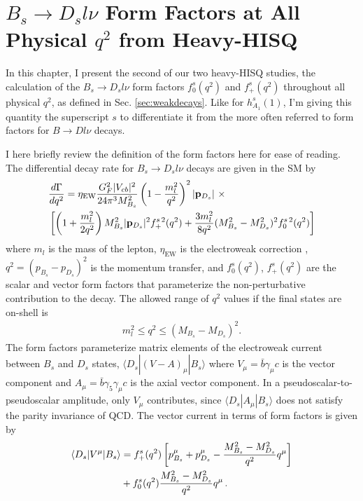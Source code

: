 ﻿\chapter{$B_s\to D_sl\nu$ Form Factors at All Physical $q^2$ from Heavy-HISQ}
\label{chap:BsDs}

In this chapter, I present the second of our two heavy-HISQ studies, the calculation of the $B_s\to D_sl\nu$ form factors $f^s_0(q^2)$ and $f^s_+(q^2)$ throughout all physical $q^2$, as defined in Sec. \ref{sec:weakdecays}. Like for $h_{A_1}^s(1)$, I'm giving this quantity the superscript $s$ to differentiate it from the more often referred to form factors for $B\to Dl\nu$ decays.

I here briefly review the definition of the form factors here for ease of reading. The differential decay rate for $B_s\to D_s l \nu$ decays are given in the SM by
\begin{align}
  &{d\Gamma\over dq^2} = \eta_{\text{EW}} { G_F^2 |V_{cb}|^2\over 24 \pi^3 M_{B_s}^2 } \left( 1 - {m_l^2\over q^2}\right)^2 |{\bf{p}}_{D_s}| \,\,\times \\
  \label{eq:branchingfraction}
  &\left[ \left( 1 + {m_l^2\over 2q^2}\right) M_{B_s}^2 |{\bf{p}}_{D_s}|^2 f_+^{s\,2}(q^2) + {3m_l^2\over 8q^2} (M_{B_s}^2-M_{D_s}^2)^2 f_0^{s\,2}(q^2) \right] \nonumber
\end{align}
where $m_l$ is the mass of the lepton, $\eta_{\text{EW}}$ is the electroweak correction \cite{SIRLIN198283,Ginsberg1968,PhysRevD.41.1736}, $q^2 = (p_{B_s} - p_{D_s})^2$ is the momentum transfer, and $f_0^s(q^2)$, $f_+^s(q^2)$ are the scalar and vector form factors that parameterize the non-perturbative contribution to the decay. The allowed range of $q^2$ values if the final states are on-shell is
\begin{align}
  m_l^2 \leq q^2 \leq (M_{B_s}-M_{D_s})^2.
\end{align}
The form factors parameterize matrix elements of the electroweak current between $B_s$ and $D_s$ states, $\langle D_s | (V-A)_{\mu} | B_s \rangle$ where $V_{\mu}=\bar{b}\gamma_{\mu}c$ is the vector component and $A_{\mu}=\bar{b}\gamma_5\gamma_{\mu} c$ is the axial vector component. In a pseudoscalar-to-pseudoscalar amplitude, only $V_{\mu}$ contributes, since $\langle D_s | A_{\mu} | B_s \rangle$ does not satisfy the parity invariance of QCD. The vector current in terms of form factors is given by
\begin{align}
  \langle D_s | V^{\mu} | B_s \rangle &= f_+^s(q^2) \left[ p_{B_s}^{\mu} + p_{D_s}^{\mu} - {M_{B_s}^2 - M_{D_s}^2 \over q^2} q^{\mu} \right] \nonumber \\
  &+ f_0^s(q^2) { M_{B_s}^2 - M_{D_s}^2 \over q^2} q^{\mu}\,.
  \label{eq:vectorcurrent}
\end{align}
